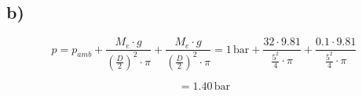 

\subsection*{b)}
\[
p = p_{amb} + \frac{M_e \cdot g}{\left(\frac{D}{2}\right)^2 \cdot \pi} + \frac{M_e \cdot g}{\left(\frac{D}{2}\right)^2 \cdot \pi} = 1 \, \text{bar} + \frac{32 \cdot 9.81}{\frac{5^2}{4} \cdot \pi} + \frac{0.1 \cdot 9.81}{\frac{5^2}{4} \cdot \pi}
\]

\[
= 1.40 \, \text{bar}
\]
